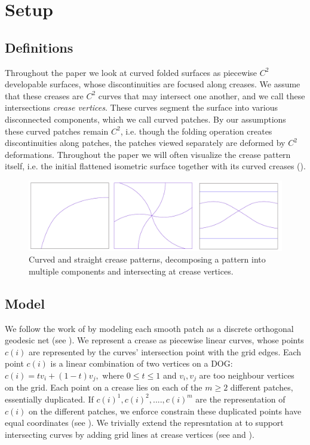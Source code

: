\section{Setup} \label{sec:pre}
\subsection{Definitions}
Throughout the paper we look at curved folded surfaces as piecewise $C^2$ developable surfaces, whose discontinuities are focused along creases. We assume that these creases are $C^2$ curves that may intersect one another, and we call these intersections \textit{crease vertices}. These curves segment the surface into various disconnected components, which we call curved patches. By our assumptions these curved patches remain $C^2$, i.e. though the folding operation creates discontinuities along patches, the patches viewed separately are deformed by $C^2$ deformations. Throughout the paper we will often visualize the crease pattern itself, i.e. the initial flattened isometric surface together with its curved creases ().
\begin{figure} [h]
	\centering
	\includegraphics[width=\linewidth]{figures/crease_patterns}
	\caption{Curved and straight crease patterns, decomposing a pattern into multiple components and intersecting at crease vertices.}
	\label{fig:crease_pattern}
\end{figure}

\subsection{Model}
We follow the work of \cite{rabi2018shape} by modeling each smooth patch as a discrete orthogonal geodesic net (see ). We represent a crease as piecewise linear curves, whose points $c(i)$ are represented by the curves' intersection point with the grid edges. Each point $c(i)$ is a linear combination of two vertices on a DOG: $c(i) = t v_i + (1-t)v_j,$ where $0 \leq t \leq 1$ and $v_i,v_j$ are too neighbour vertices on the grid.  Each point on a crease lies on each of the $m \geq 2$ different patches, essentially duplicated. If $c(i)^1,c(i)^2,....,c(i)^m$ are the representation of $c(i)$ on the different patches, we enforce constrain these duplicated points have equal coordinates (see ).
We trivially extend the represntation at \cite{rabi2018shape} to support intersecting curves by adding grid lines at crease vertices (see  and ).

